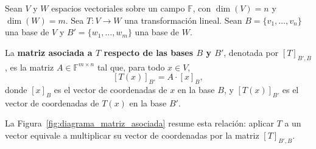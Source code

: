 \begin{definition}
Sean $V$ y $W$ espacios vectoriales sobre un campo $\mathbb{F}$, con $\dim(V) = n$ y $\dim(W) = m$. Sea $T: V \to W$ una transformación lineal. Sean $B = \{v_1, \ldots, v_n\}$ una base de $V$ y $B' = \{w_1, \ldots, w_m\}$ una base de $W$.

La \textbf{matriz asociada a $T$ respecto de las bases $B$ y $B'$}, denotada por $[T]_{B', B}$, es la matriz $A \in \mathbb{F}^{m \times n}$ tal que, para todo $x \in V$,
\[
[T(x)]_{B'} = A \cdot [x]_B,
\]
donde $[x]_B$ es el vector de coordenadas de $x$ en la base $B$, y $[T(x)]_{B'}$ es el vector de coordenadas de $T(x)$ en la base $B'$.
\end{definition}

La Figura~\ref{fig:diagrama_matriz_asociada} resume esta relación: aplicar $T$ a un vector equivale a multiplicar su vector de coordenadas por la matriz $[T]_{B',B}$.


